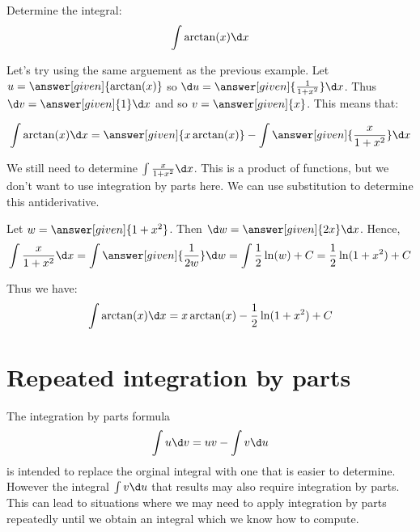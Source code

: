 \documentclass{ximera}
\begin{document}
\begin{example}
Determine the integral:
\[ 
\int \arctan(x) \d x
\]
\begin{explanation}
Let's try using the same arguement as the previous example.  Let $u=\answer[given]{\arctan (x)}$ so $\d u=\answer[given]{\frac{1}{1+x^{2}} } \d x$. Thus $\d v=\answer[given]{1} \d x$ and so $v=\answer[given]{x}$. 
This means that:

\[
\int \arctan(x) \d x= \answer[given]{x\arctan(x)}- \int \answer[given]{\frac{x}{1+x^{2}}} \d x
\]

We still need to determine $\int \frac{x}{1+x^{2}} \d x$. This is a product of functions, but we don't want to use integration by parts here.  We can use substitution to determine this antiderivative. 

Let $w=\answer[given]{1+x^{2}}$. Then $\d w=\answer[given]{2 x} \d x$. Hence, 
\[
\int \frac{x}{1+x^{2}} \d x= \int \answer[given]{\frac{1}{2 w}} \d w \\
 = \int \frac{1}{2} \ln(w) + C=\frac{1}{2} \ln(1+x^{2})+C \\
\]

Thus we have:
\[ 
\int \arctan(x) \d x = x \arctan(x) -\frac{1}{2} \ln(1+x^{2}) +C
\]
\end{explanation}
\end{example}






\section{Repeated integration by parts}

The  integration by parts formula
 \[
\int u \d v= uv - \int v \d u
\]
 is intended to replace the orginal integral with one that is easier to determine. However the integral $\int v \d u$ that results may also require integration by parts. This can lead to situations where we may need to apply integration by parts repeatedly until we obtain an integral which we know how to compute. 


%
\end{document}
